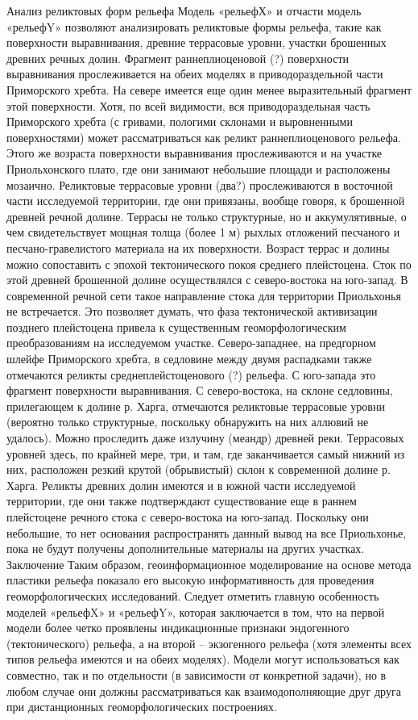 \documentclass[runningheads]{AIIT}
\begin{document}
Анализ реликтовых форм рельефа
Модель «рельефХ» и отчасти модель «рельефY» позволяют анализировать реликтовые формы рельефа, такие как поверхности выравнивания, древние террасовые уровни, участки брошенных древних речных долин.
Фрагмент раннеплиоценовой (?) поверхности выравнивания прослеживается на обеих моделях в приводораздельной части Приморского хребта. На севере имеется еще один менее выразительный фрагмент этой поверхности. Хотя, по всей видимости, вся приводораздельная часть Приморского хребта (с гривами, пологими склонами и выровненными поверхностями) может рассматриваться как реликт раннеплиоценового рельефа. Этого же возраста поверхности выравнивания прослеживаются и на участке Приольхонского плато, где они занимают небольшие площади и расположены мозаично.
Реликтовые террасовые уровни (два?) прослеживаются в восточной части исследуемой территории, где они привязаны, вообще говоря, к брошенной древней речной долине. Террасы не только структурные, но и аккумулятивные, о чем свидетельствует мощная толща (более 1 м) рыхлых отложений песчаного и песчано-гравелистого материала на их поверхности. Возраст террас и долины можно сопоставить с эпохой тектонического покоя среднего плейстоцена. Сток по этой древней брошенной долине осуществлялся с северо-востока на юго-запад. В современной речной сети такое направление стока для территории Приольхонья не встречается. Это позволяет думать, что фаза тектонической активизации позднего плейстоцена привела к существенным геоморфологическим преобразованиям на исследуемом участке.
Северо-западнее, на предгорном шлейфе Приморского хребта, в седловине между двумя распадками также отмечаются реликты среднеплейстоценового (?) рельефа. С юго-запада это фрагмент поверхности выравнивания. С северо-востока, на склоне седловины, прилегающем к долине р. Харга, отмечаются реликтовые террасовые уровни (вероятно только структурные, поскольку обнаружить на них аллювий не удалось). Можно проследить даже излучину (меандр) древней реки. Террасовых уровней здесь, по крайней мере, три, и там, где заканчивается самый нижний из них, расположен резкий крутой (обрывистый) склон к современной долине р. Харга.
Реликты древних долин имеются и в южной части исследуемой территории, где они также подтверждают существование еще в раннем плейстоцене речного стока с северо-востока на юго-запад. Поскольку они небольшие, то нет основания распространять данный вывод на все Приольхонье, пока не будут получены дополнительные материалы на других участках.
Заключение
Таким образом, геоинформационное моделирование на основе метода пластики рельефа показало его высокую информативность для проведения геоморфологических исследований. Следует отметить главную особенность моделей «рельефX» и «рельефY», которая заключается в том, что на первой модели более четко проявлены индикационные признаки эндогенного (тектонического) рельефа, а на второй – экзогенного рельефа (хотя элементы всех типов рельефа имеются и на обеих моделях). Модели могут использоваться как совместно, так и по отдельности (в зависимости от конкретной задачи), но в любом случае они должны рассматриваться как взаимодополняющие друг друга при дистанционных геоморфологических построениях.
\end{document}
